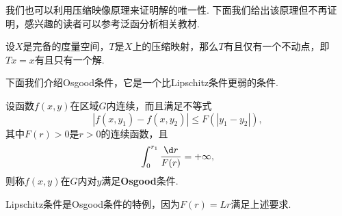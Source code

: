 \documentclass[lang=cn,10pt]{elegantbook}
\begin{document}
\begin{remark}
	我们也可以利用压缩映像原理来证明解的唯一性. 下面我们给出该原理但不再证明，感兴趣的读者可以参考泛函分析相关教材.
\end{remark}
\begin{theorem}[压缩映像原理]
	设$X$是完备的度量空间，$T$是$X$上的压缩映射，那么$T$有且仅有一个不动点，即$Tx=x$有且只有一个解.
\end{theorem}
下面我们介绍Osgood条件，它是一个比Lipschitz条件更弱的条件.
\begin{definition}[Osgood条件]
	设函数$f(x,y)$在区域$G$内连续，而且满足不等式
	$$|f(x,y_1)-f(x,y_2)|\leqslant F(|y_1-y_2|),$$
	其中$F(r)>0$是$r>0$的连续函数，且
	$$\int_{0}^{r_1}\frac{\d r}{F(r)}=+\infty,$$
	则称$f(x,y)$在$G$内对$y$满足\textbf{Osgood}{\heiti 条件}.
\end{definition}
\begin{remark}
	Lipschitz条件是Osgood条件的特例，因为$F(r)=Lr$满足上述要求.
\end{remark}





	
\end{document}
